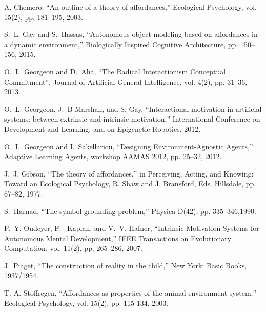 \documentclass[conference]{IEEEtran}
\begin{document}
\begin{thebibliography}{00}

A. Chemero, ``An outline of a theory of affordances,'' Ecological Psychology, vol. 15(2), pp. 181--195, 2003.

S.~L. Gay and S.~Hassas, ``Autonomous object modeling based on affordances in a dynamic environment,''
Biologically Inspired Cognitive Architecture, pp. 150--156, 2015.

O.~L. Georgeon and D.~Aha, ``The Radical Interactionism Conceptual Commitment'',
Journal of Artificial General Intelligence, vol. 4(2), pp. 31--36, 2013.

O.~L. Georgeon, J.~B Marshall, and S. Gay, ``Interactional motivation in artificial systems: between extrinsic and intrinsic motivation,'' International Conference on Development and Learning, and on Epigenetic Robotics, 2012. 

O.~L. Georgeon and I.~Sakellariou, ``Designing Environment-Agnostic Agents,'' 
Adaptive Learning Agents, workshop AAMAS 2012, pp. 25--32, 2012.

J.~J. Gibson, ``The theory of affordances,''
in Perceiving, Acting, and Knowing: Toward an Ecological Psychology, R. Shaw and J. Bransford, Eds. Hillsdale, pp. 67--82, 1977.

S.~Harnad, ``The symbol grounding problem,'' 
Physica D(42), pp. 335--346,1990.

P.~Y. Oudeyer, F.~ Kaplan, and V.~V. Hafner, ``Intrinsic Motivation Systems for Autonomous Mental Development,'' 
IEEE Transactions on Evolutionary Computation, vol. 11(2), pp. 265--286, 2007.

J.~Piaget, ``The construction of reality in the child,'' New York: Basic Books, 1937/1954.

T. A. Stoffregen, ``Affordances as properties of the animal environment
system,'' Ecological Psychology, vol. 15(2), pp. 115-134, 2003.



\end{thebibliography}
\end{document}
